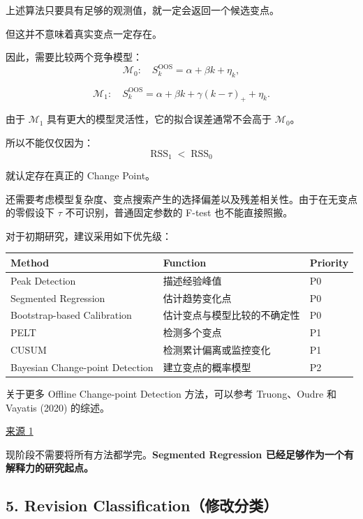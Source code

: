上述算法只要具有足够的观测值，就一定会返回一个候选变点。

但这并不意味着真实变点一定存在。

因此，需要比较两个竞争模型：
\[\mathcal M_0:
\quad
S_k^{\mathrm{OOS}}
=
\alpha+\beta k+\eta_k,\]

\[\mathcal M_1:
\quad
S_k^{\mathrm{OOS}}
=
\alpha+\beta k+\gamma(k-\tau)_+
+\eta_k.\]

由于 \(\mathcal M_1\) 具有更大的模型灵活性，它的拟合误差通常不会高于 \(\mathcal M_0\)。

所以不能仅仅因为：
\[\operatorname{RSS}_1<\operatorname{RSS}_0\]

就认定存在真正的 Change Point。

还需要考虑模型复杂度、变点搜索产生的选择偏差以及残差相关性。由于在无变点的零假设下 \(\tau\) 不可识别，普通固定参数的 F-test 也不能直接照搬。

对于初期研究，建议采用如下优先级：

\begin{readertable}
\begin{longtable}[]{@{}
  >{\raggedright\arraybackslash}p{}
  >{\raggedright\arraybackslash}p{}
  >{\raggedright\arraybackslash}p{}@{}}
\toprule
Method & Function & Priority \\
\midrule
\endhead
Peak Detection & 描述经验峰值 & P0 \\
Segmented Regression & 估计趋势变化点 & P0 \\
Bootstrap-based Calibration & 估计变点与模型比较的不确定性 & P0 \\
PELT & 检测多个变点 & P1 \\
CUSUM & 检测累计偏离或监控变化 & P1 \\
Bayesian Change-point Detection & 建立变点的概率模型 & P2 \\
\bottomrule
\end{longtable}
\end{readertable}

关于更多 Offline Change-point Detection 方法，可以参考 Truong、Oudre 和 Vayatis (2020) 的综述。

\href{https://www.sciencedirect.com/science/article/pii/S0165168419303494}{来源 1}

现阶段不需要将所有方法都学完。\textbf{Segmented Regression 已经足够作为一个有解释力的研究起点。}

\hypertarget{part-3-48-0001-revision-classificationux4feeux6539ux5206ux7c7b}{%
\subsection{5. Revision Classification（修改分类）}\label{part-3-48-0001-revision-classificationux4feeux6539ux5206ux7c7b}}

